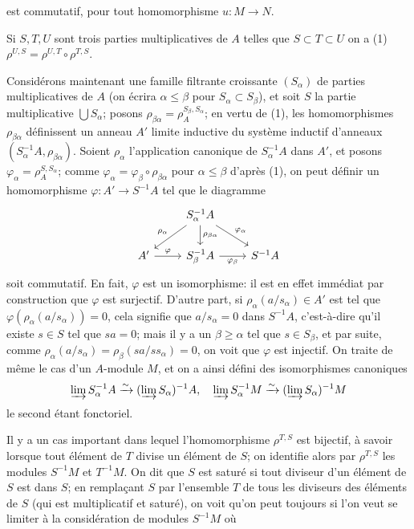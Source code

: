 
\noindent
est commutatif, pour tout homomorphisme $u: M \to N$.

Si $S, T, U$ sont trois parties multiplicatives de $A$ telles que $S \subset T \subset U$ on a
(1) $\rho^{U,S} = \rho^{U,T} \circ \rho^{T,S}$.

Considérons maintenant une famille filtrante croissante $(S_\alpha)$ de parties multiplicatives de $A$ (on écrira $\alpha \leq \beta$ pour $S_\alpha \subset S_\beta$), et soit $S$ la partie multiplicative $\bigcup S_\alpha$; posons $\rho_{\beta\alpha} = \rho_A^{S_\beta, S_\alpha}$; en vertu de (1), les homomorphismes $\rho_{\beta\alpha}$ définissent un anneau $A'$ limite inductive du système inductif d'anneaux $(S_\alpha^{-1}A, \rho_{\beta\alpha})$. Soient $\rho_\alpha$ l'application canonique de $S_\alpha^{-1}A$ dans $A'$, et posons $\varphi_\alpha = \rho_A^{S, S_\alpha}$; comme $\varphi_\alpha = \varphi_\beta \circ \rho_{\beta\alpha}$ pour $\alpha \leq \beta$ d'après (1), on peut définir un homomorphisme $\varphi: A' \to S^{-1}A$ tel que le diagramme
$$ \begin{tikzcd} & S_\alpha^{-1}A \arrow[dl, "\rho_\alpha"'] \arrow[d, "\rho_{\beta\alpha}"] \arrow[dr, "\varphi_\alpha"] & \\ A' \arrow[r, "\varphi"] & S_\beta^{-1}A \arrow[r, "\varphi_\beta"'] & S^{-1}A \end{tikzcd} $$
soit commutatif. En fait, $\varphi$ est un isomorphisme: il est en effet immédiat par construction que $\varphi$ est surjectif. D'autre part, si $\rho_\alpha(a/s_\alpha) \in A'$ est tel que $\varphi(\rho_\alpha(a/s_\alpha)) = 0$, cela signifie que $a/s_\alpha = 0$ dans $S^{-1}A$, c'est-à-dire qu'il existe $s \in S$ tel que $sa = 0$; mais il y a un $\beta \geq \alpha$ tel que $s \in S_\beta$, et par suite, comme $\rho_\alpha(a/s_\alpha) = \rho_\beta(sa/ss_\alpha) = 0$, on voit que $\varphi$ est injectif. On traite de même le cas d'un $A$-module $M$, et on a ainsi défini des isomorphismes canoniques
$$ \varinjlim S_\alpha^{-1}A \xrightarrow{\sim} (\varinjlim S_\alpha)^{-1}A, \quad \varinjlim S_\alpha^{-1}M \xrightarrow{\sim} (\varinjlim S_\alpha)^{-1}M $$
le second étant fonctoriel.

Il y a un cas important dans lequel l'homomorphisme $\rho^{T,S}$ est bijectif, à savoir lorsque tout élément de $T$ divise un élément de $S$; on identifie alors par $\rho^{T,S}$ les modules $S^{-1}M$ et $T^{-1}M$. On dit que $S$ est saturé si tout diviseur d'un élément de $S$ est dans $S$; en remplaçant $S$ par l'ensemble $T$ de tous les diviseurs des éléments de $S$ (qui est multiplicatif et saturé), on voit qu'on peut toujours si l'on veut se limiter à la considération de modules $S^{-1}M$ où
